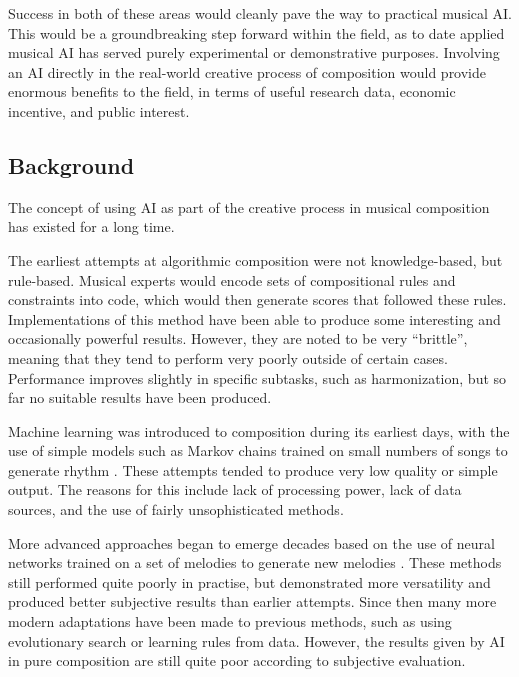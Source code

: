\documentclass[11pt]{article}
\begin{document}
	Success in both of these areas would cleanly pave the way to practical musical AI. This would be a groundbreaking step forward within the field, as to date applied musical AI has served purely experimental or demonstrative purposes. Involving an AI directly in the real-world creative process of composition would provide enormous benefits to the field, in terms of useful research data, economic incentive, and public interest.
	
	\subsection{Background}
	
	The concept of using AI as part of the creative process in musical composition has existed for a long time.
	
	The earliest attempts at algorithmic composition were not knowledge-based, but rule-based. Musical experts would encode sets of compositional rules and constraints into code, which would then generate scores that followed these rules. Implementations of this method have been able to produce some interesting and occasionally powerful results. However, they are noted to be very ``brittle'', meaning that they tend to perform very poorly outside of certain cases. Performance improves slightly in specific subtasks, such as harmonization, but so far no suitable results have been produced.
	
	Machine learning was introduced to composition during its earliest days, with the use of simple models such as Markov chains trained on small numbers of songs to generate rhythm \cite[]{pinkerton1956information}. These attempts tended to produce very low quality or simple output. The reasons for this include lack of processing power, lack of data sources, and the use of fairly unsophisticated methods. 
	
	More advanced approaches began to emerge decades based on the use of neural networks trained on a set of melodies to generate new melodies \cite[]{todd1989connectionist}. These methods still performed quite poorly in practise, but demonstrated more versatility and produced better subjective results than earlier attempts. Since then many more modern adaptations have been made to previous methods, such as using evolutionary search or learning rules from data. However, the results given by AI in pure composition are still quite poor according to subjective evaluation. 
	
\end{document}

